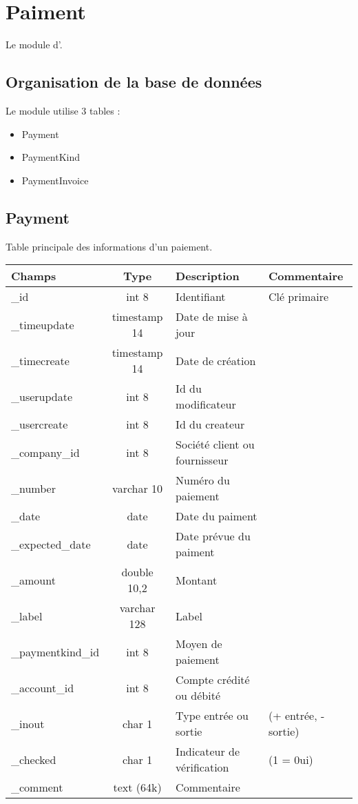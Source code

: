 

\clearpage
\section{Paiment}

Le module \payment d'\obm.

\subsection{Organisation de la base de données}

Le module \payment utilise 3 tables :
\begin{itemize}
 \item Payment
 \item PaymentKind
 \item PaymentInvoice
\end{itemize}

\subsection{Payment}
Table principale des informations d'un paiement.\\

\begin{tabular}{|p{3cm}|c|p{5.4cm}|p{2.6cm}|}
\hline
\textbf{Champs} & \textbf{Type} & \textbf{Description} & \textbf{Commentaire} \\
\hline
\_id & int 8 & Identifiant & Clé primaire \\
\hline
\_timeupdate & timestamp 14 & Date de mise à jour & \\
\hline
\_timecreate & timestamp 14 & Date de création & \\
\hline
\_userupdate & int 8 & Id du modificateur & \\
\hline
\_usercreate & int 8 & Id du createur & \\
\hline
\_company\_id & int 8 & Société client ou fournisseur & \\
\hline
\_number & varchar 10 & Numéro du paiement & \\
\hline
\_date & date & Date du paiment & \\
\hline
\_expected\_date & date & Date prévue du paiment & \\
\hline
\_amount & double 10,2 & Montant &\\
\hline
\_label & varchar 128 & Label & \\
\hline
\_paymentkind\_id & int 8 & Moyen de paiement & \\
\hline
\_account\_id & int 8 & Compte crédité ou débité & \\
\hline
\_inout & char 1 & Type entrée ou sortie & (+ entrée, - sortie) \\
\hline
\_checked & char 1 & Indicateur de vérification & (1 = 0ui)\\
\hline
\_comment & text (64k) & Commentaire &\\
\hline
\end{tabular}


